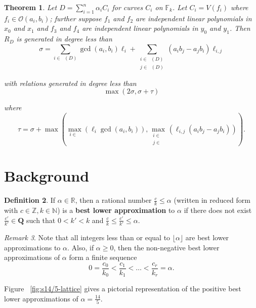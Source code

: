 \documentclass{amsart}
\theoremstyle{plain}
\newtheorem{thm}{Theorem}[section]
\theoremstyle{definition}
\newtheorem{defn}[thm]{Definition}
\theoremstyle{remark}
\newtheorem{rem}[thm]{Remark}
\numberwithin{equation}{section}
\newcommand\bn{{\mathbb N}}
\newcommand\br{{\mathbb R}}
\newcommand\bz{{\mathbb Z}}
\newcommand\sco{{\mathscr O}}
\newcommand\bida{a}
\newcommand\bidb{b}
\newcommand\hirz{\mathbb{F}}
\DeclareMathOperator{\Te}{T_=}
\DeclareMathOperator{\Tp}{T_+}
\DeclareMathOperator{\Tm}{T_-}
\begin{document}

\begin{thm}
\label{lem:hirz-generators-relations}
Let $D = \sum_{i=1}^n \alpha_i C_i$ for curves $C_i$ on $\hirz_k$.  
Let $C_i = V(f_i)$ where $f_i \in \sco(a_i, b_i)$; further 
suppose $f_1$ and $f_2$ are independent linear
polynomials in $x_0$ and $x_1$ and $f_3$ and $f_4$ are independent
linear polynomials in $y_0$ and $y_1$.
Then $R_D$ is generated in degree less than 
\[
	\sigma = \sum_{i\in \Te(D)} \gcd(\bida_i, \bidb_i)\ell_i +
	\sum_{\substack{i	\in \Tp(D) \\	j \in \Tm(D)}} (\bida_i
	\bidb_j - \bida_j \bidb_i)\ell_{i,j}
\]

\noindent
with relations generated in degree less than 
\[
	\max(2 \sigma, \sigma + \tau)
\]

\noindent
where
\[
	\tau = \sigma
	+ \max \left( \max_{i\in \Te}(\ell_i \gcd(a_i, b_i)), \max_{
	\substack{i \in	\Tp \\ j\in \Tm}}(\ell_{i,j} (\bida_i \bidb_j
	- \bida_j \bidb_i))	\right).
\]
\end{thm}

\section{Background}

\begin{defn}
\label{defn:lower-approximation}
If $\alpha \in \br$, then a rational number $\frac{c}{k} \leq \alpha$
(written in reduced form with $c \in \bz, k \in \bn$) is a
\textbf{best lower approximation} to $\alpha$ if there does not
exist $\frac{c'}{k'}\in \mathbf{Q}$ such that $0 < k'< k$ and
$\frac{c}{k} \le \frac{c'}{k'} \le \alpha$. 
\end{defn}

\begin{rem}
\label{rem:lower-approximation}
Note that all integers less than or equal to $\lfloor \alpha \rfloor$
are best lower approximations to $\alpha$. Also, if $\alpha \ge 0$,
then the non-negative best lower approximations of
$\alpha$ form a finite sequence
\[
	0 = \frac{c_0}{k_0} < \frac{c_1}{k_1} < \ldots < \frac{c_r}{k_r} = \alpha.
\]

\noindent
Figure ~\ref{fig:s14/5-lattice} gives a pictorial representation of the positive best lower approximations of $\alpha = \frac{14}{5}$.
\end{rem}
\end{document}

